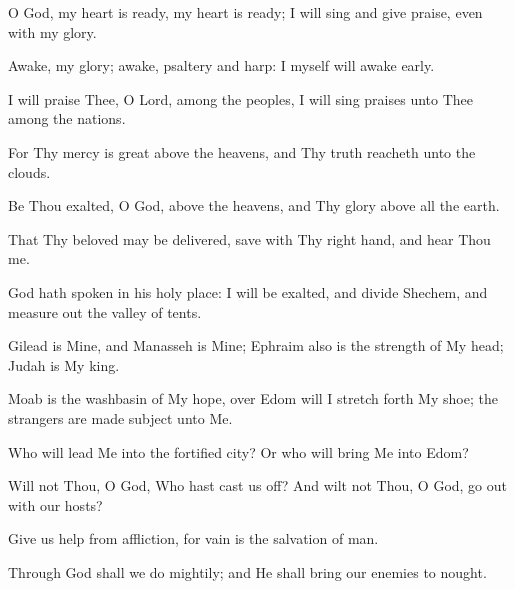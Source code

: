 O God, my heart is ready, my heart is ready; I will sing and give praise, even with my glory.

Awake, my glory; awake, psaltery and harp: I myself will awake early.

I will praise Thee, O Lord, among the peoples, I will sing praises unto Thee among the nations.

For Thy mercy is great above the heavens, and Thy truth reacheth unto the clouds.

Be Thou exalted, O God, above the heavens, and Thy glory above all the earth.

That Thy beloved may be delivered, save with Thy right hand, and hear Thou me.

God hath spoken in his holy place: I will be exalted, and divide Shechem, and measure out the valley of tents.

Gilead is Mine, and Manasseh is Mine; Ephraim also is the strength of My head; Judah is My king.

Moab is the washbasin of My hope, over Edom will I stretch forth My shoe; the strangers are made subject unto Me.

Who will lead Me into the fortified city? Or who will bring Me into Edom?

Will not Thou, O God, Who hast cast us off? And wilt not Thou, O God, go out with our hosts?

Give us help from affliction, for vain is the salvation of man.

Through God shall we do mightily; and He shall bring our enemies to nought.
